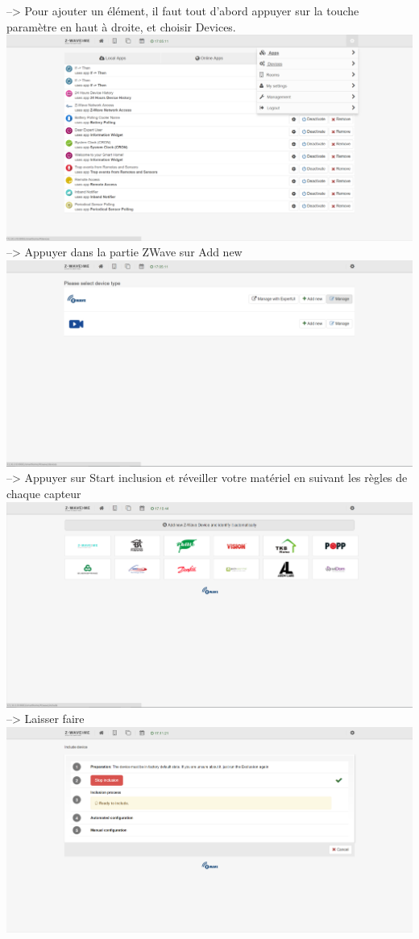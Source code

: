 --> Pour ajouter un élément, il faut tout d'abord appuyer sur la touche paramètre en haut à droite, et choisir Devices.
\includegraphics[scale=0.5]{./latex/Images/png/menu_zwaveme.png}\newline
 --> Appuyer dans la partie ZWave sur Add new
\includegraphics[scale=0.5]{./latex/Images/png/devices_zwaveme.png}\newline
--> Appuyer sur Start inclusion et réveiller votre matériel en suivant les règles de chaque capteur
\includegraphics[scale=0.5]{./latex/Images/png/add_zwaveme.png}\newline
--> Laisser faire
\includegraphics[scale=0.5]{./latex/Images/png/add2_zwaveme.png}\newline
